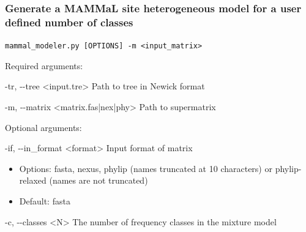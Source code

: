 \documentclass{article}
\def\code#1{\texttt{#1}}
\begin{document}
        \subsubsection{Generate a MAMMaL site heterogeneous model for a user defined number of classes}
        \begin{description}
        
            \vspace{0.2cm}
            \item \code{mammal\_modeler.py [OPTIONS] -m <input\_matrix>}
            \vspace{0.2cm}
            
            \begin{description}
                \item Required arguments:
                \begin{description}
                    \item -tr, -\/-tree \hspace{0.2cm} <input.tre> \hspace{0.2cm} Path to tree in Newick format
                    \item -m, -\/-matrix \hspace{0.2cm} <matrix.fas|nex|phy> \hspace{0.2cm} Path to supermatrix
                \end{description}
            \end{description}
            \vspace{0.2cm}
            \begin{description}
                \item Optional arguments:
                \begin{description}
                    \item -if, -\/-in\_format \hspace{0.2cm} <format> \hspace{0.2cm} Input format of matrix
                    \begin{itemize}
                        \item Options: fasta, nexus, phylip (names truncated at 10 characters) or phylip-relaxed (names are not truncated)
                        \item Default: fasta
                    \end{itemize}
                    \item -c,  -\/-classes \hspace{0.2cm} <N> \hspace{0.2cm} The number of frequency classes in the mixture model

\end{description}
\end{description}
\end{description}
\end{document}
